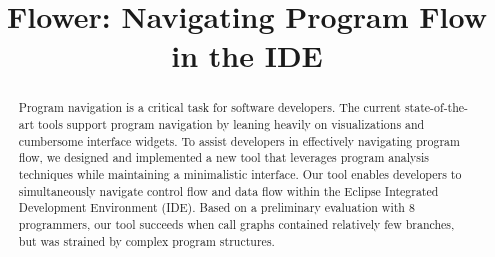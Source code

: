 \documentclass[conference]{IEEEtran}
\begin{document}
%
\title{Flower: Navigating Program Flow in the IDE}


\author{
}

\maketitle

\begin{abstract}
Program navigation is a critical task for software developers. 
The current state-of-the-art tools support program navigation by leaning heavily on visualizations and cumbersome interface widgets.
To assist developers in effectively navigating program flow, we designed and implemented a new tool that leverages program analysis techniques while maintaining a minimalistic interface.
Our tool enables developers to simultaneously navigate control flow and data flow within the Eclipse Integrated Development Environment (IDE).
Based on a preliminary evaluation with 8 programmers, our tool succeeds when call graphs contained relatively few branches, but was strained by complex program structures. 
\end{abstract}
\end{document}

